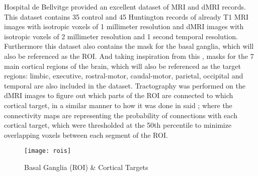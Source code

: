  \par

Hospital de Bellvitge provided an excellent dataset of \ac{MRI} and \ac{dMRI} records. This dataset contains 35 control and 45 Huntington records of already  T1 \ac{MRI} images with isotropic voxels of 1 millimeter resolution and \ac{dMRI} images with isotropic voxels of 2 millimeter resolution and 1 second temporal resolution. Furthermore this dataset also contains the mask for the basal ganglia, which will also be referenced as the \ac{ROI}. And taking inspiration from this , masks for the 7 main cortical regions of the brain, which will also be referenced as the target regions: limbic, executive, rostral-motor, caudal-motor, parietal, occipital and temporal are also included in the dataset. Tractography was performed on the \ac{dMRI} images to figure out which parts of the \ac{ROI} are connected to which cortical target, in a similar manner to how it was done in said ; where the connectivity maps are representing the probability of connections with each cortical target, which were thresholded at the 50th percentile to minimize overlapping voxels between each segment of the \ac{ROI}.\par

\begin{figure}[H]
\centering
\texttt{[image: rois]}
\caption{Basal Ganglia (ROI) \& Cortical Targets}
\label{fig:rois}
\end{figure}

